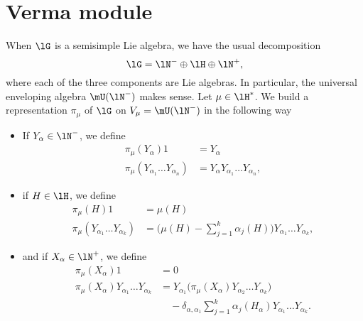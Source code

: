\section{Verma module}

When $\lG$ is a semisimple Lie algebra, we have the usual decomposition\cite{VermaPiercey}
\begin{equation}
	\lG=\lN^-\oplus\lH\oplus\lN^+,
\end{equation}
where each of the three components are Lie algebras. In particular, the universal enveloping algebra $\mU(\lN^-)$ makes sense. Let $\mu\in\lH^*$. We build a representation $\pi_{\mu}$ of $\lG$ on $V_{\mu}=\mU(\lN^-)$ in the following way
\begin{itemize}
	\item If $Y_{\alpha}\in\lN^-$, we define
	      \begin{subequations}
		      \begin{align}
			      \pi_{\mu}(Y_{\alpha})1                     & =Y_{\alpha}                                 \\
			      \pi_{\mu}(Y_{\alpha_1}\ldots Y_{\alpha_n}) & =Y_{\alpha}Y_{\alpha_1}\ldots Y_{\alpha_n},
		      \end{align}
	      \end{subequations}
	\item if $H\in\lH$, we define
	      \begin{subequations}
		      \begin{align}
			      \pi_{\mu}(H)1                              & =\mu(H)                                                                      \\
			      \pi_{\mu}(Y_{\alpha_1}\ldots Y_{\alpha_k}) & = \big( \mu(H)-\sum_{j=1}^k\alpha_j(H) \big)Y_{\alpha_1}\ldots Y_{\alpha_k},
		      \end{align}
	      \end{subequations}
	\item and if $X_{\alpha}\in\lN^+$, we define
	      \begin{subequations}
		      \begin{align}
			      \pi_{\mu}(X_{\alpha})1                               & =0                                                                                               \\
			      \pi_{\mu}(X_{\alpha})Y_{\alpha_1}\ldots Y_{\alpha_k} & =Y_{\alpha_1}\big( \pi_{\mu}(X_{\alpha})Y_{\alpha_2}\ldots Y_{\alpha_k} \big)                    \\
			                                                           & \quad  -\delta_{\alpha,\alpha_1}\sum_{j=1}^k\alpha_j(H_{\alpha})Y_{\alpha_1}\ldots Y_{\alpha_k}.
		      \end{align}
	      \end{subequations}
\end{itemize}
